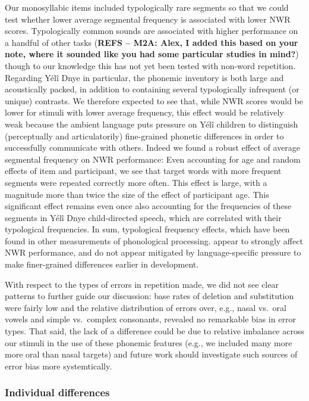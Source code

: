 \documentclass[english,,man,floatsintext]{apa6}
\begin{document}
Our monosyllabic items included typologically rare segments so that we could test whether lower average segmental frequency is associated with lower NWR scores. Typologically common sounds are associated with higher performance on a handful of other tasks (\textbf{REFS -- M2A: Alex, I added this based on your note, where it sounded like you had some particular studies in mind?}) though to our knowledge this has not yet been tested with non-word repetition. Regarding Yélî Dnye in particular, the phonemic inventory is both large and acoustically packed, in addition to containing several typologically infrequent (or unique) contrasts. We therefore expected to see that, while NWR scores would be lower for stimuli with lower average frequency, this effect would be relatively weak because the ambient language puts pressure on Yélî children to distinguish (perceptually and articulatorily) fine-grained phonetic differences in order to successfully communicate with others. Indeed we found a robust effect of average segmental frequency on NWR performance: Even accounting for age and random effects of item and participant, we see that target words with more frequent segments were repeated correctly more often. This effect is large, with a magnitude more than twice the size of the effect of participant age. This significant effect remains even once also accounting for the frequencies of these segments in Yélî Dnye child-directed speech, which are correlated with their typological frequencies. In sum, typological frequency effects, which have been found in other measurements of phonological processing. appear to strongly affect NWR performance, and do not appear mitigated by language-specific pressure to make finer-grained differences earlier in development.

With respect to the types of errors in repetition made, we did not see clear patterns to further guide our discussion: base rates of deletion and substitution were fairly low and the relative distribution of errors over, e.g., nasal vs.~oral vowels and simple vs.~complex consonants, revealed no remarkable bias in error types. That said, the lack of a difference could be due to relative imbalance across our stimuli in the use of these phonemic features (e.g., we included many more more oral than nasal targets) and future work should investigate such sources of error bias more systemtically.

\hypertarget{individual-differences}{%
\subsubsection{Individual differences}\label{individual-differences}}
\end{document}
